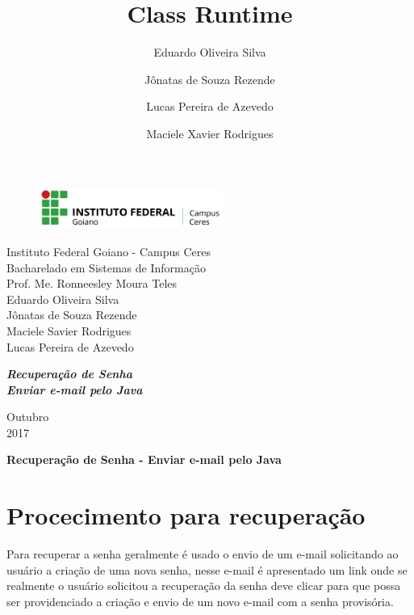\documentclass[14pt, a4paper]{article}
\title{Class Runtime}
\author{Eduardo Oliveira Silva \and Jônatas de Souza Rezende \and Lucas Pereira de Azevedo \and Maciele Xavier Rodrigues}
\begin{document}
\begin{titlepage}


\begin{center}
\begin{figure}[htb]
		
		\label{figura:LogoIF}
	
		\centering
		\includegraphics[width=6cm]{logo.png} 
\end{figure}


Instituto Federal Goiano - Campus Ceres\\
Bacharelado em Sistemas de Informação\\
Prof. Me. Ronneesley Moura Teles\\\vspace{0.2cm}
Eduardo Oliveira Silva \\
Jônatas de Souza Rezende \\
Maciele Savier Rodrigues \\
Lucas Pereira de Azevedo \\\vspace{7.0cm}

\textit{\textbf{\Large{Recuperação de Senha}}}\\\vspace{0.5cm}
\textit{\textbf{\Large{Enviar e-mail pelo Java}}}\\\vspace{9.5cm}

Outubro\\
2017\\
\end{center}
\end{titlepage}

\tableofcontents

\newpage
\begin{center}
\textbf{\Large{Recuperação de Senha - Enviar e-mail pelo Java}}\\\vspace{0.5cm}
\end{center}
\section{Procecimento para recuperação}%

Para recuperar a senha geralmente é usado o envio de um e-mail solicitando ao usuário a criação de uma nova senha, nesse e-mail é apresentado um link onde se realmente o usuário solicitou a recuperação da senha deve clicar para que possa ser providenciado a criação e envio de um novo e-mail com a senha provisória.
\end{document}
